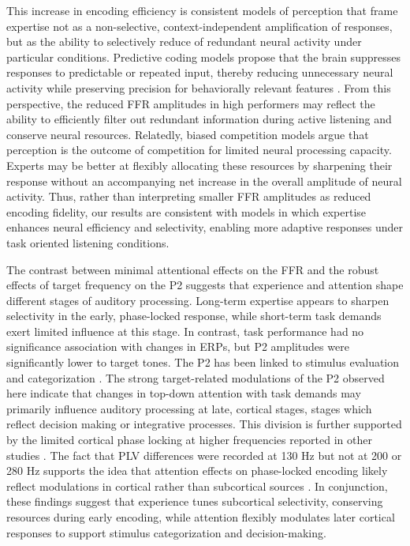 \documentclass{article}
\begin{document}
This increase in encoding efficiency is consistent models of perception that frame expertise not as a non-selective, context-independent amplification of responses, but as the ability to selectively reduce of redundant neural activity under particular conditions. Predictive coding models propose that the brain suppresses responses to predictable or repeated input, thereby reducing unnecessary neural activity while preserving precision for behaviorally relevant features \parencite{Rao_1999, Friston_2005}. From this perspective, the reduced FFR amplitudes in high performers may reflect the ability to efficiently filter out redundant information during active listening and conserve neural resources. Relatedly, biased competition models \parencite{Chelazzi_1993, Desimone_1995} argue that perception is the outcome of competition for limited neural processing capacity. Experts may be better at flexibly allocating these resources by sharpening their response without an accompanying net increase in the overall amplitude of neural activity. Thus, rather than interpreting smaller FFR amplitudes as reduced encoding fidelity, our results are consistent with models in which expertise enhances neural efficiency and selectivity, enabling more adaptive responses under task oriented listening conditions.

The contrast between minimal attentional effects on the FFR and the robust effects of target frequency on the P2 suggests that experience and attention shape different stages of auditory processing. Long-term expertise appears to sharpen selectivity in the early, phase-locked response, while short-term task demands exert limited influence at this stage. In contrast, task performance had no significance association with changes in ERPs, but P2 amplitudes were significantly lower to target tones. The P2 has been linked to stimulus evaluation and categorization \Parencite{Luck_Hillyard_1994, Naatanen_Winkler_1999}. The strong target-related modulations of the P2 observed here indicate that changes in top-down attention with task demands may primarily influence auditory processing at late, cortical stages, stages which reflect decision making or integrative processes. This division is further supported by the limited cortical phase locking at higher frequencies reported in other studies \parencite[>200 Hz; ][]{Tichko_2017, Coffey_2016}. The fact that PLV differences were recorded at 130 Hz but not at 200 or 280 Hz supports the idea that attention effects on phase-locked encoding likely reflect modulations in cortical rather than subcortical sources \parencite{Hartmann_Weisz_2019, Holmes_2017, Forte_2017}. In conjunction, these findings suggest that experience tunes subcortical selectivity, conserving resources during early encoding, while attention flexibly modulates later cortical responses to support stimulus categorization and decision-making.
\end{document}
